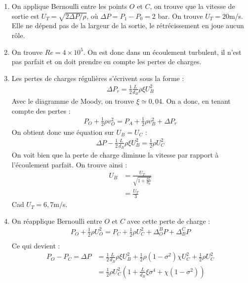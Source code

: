 \newpage

\begin{correction}

\begin{enumerate}

\item On applique Bernoulli entre les points $O$ et $C$, on trouve que la vitesse de sortie est $U_T=\sqrt{2\Delta P/\rho}$, où $\Delta P=P_1-P_0=2$ bar. On trouve $U_T=20$m/s. Elle ne dépend pas de la largeur de la sortie, le rétrécissement en joue aucun rôle.

\item On trouve $Re=4\times10^5$. On est donc dans un écoulement turbulent, il n'est pas parfait et on doit prendre en compte les pertes de charges.

\item Les pertes de charges régulières s'écrivent sous la forme :
\begin{align*}
	\Delta P_r = \frac{1}{2}\frac{L}{d_B}\rho\xi U_B^2
\end{align*}
Avec le diagramme de Moody, on trouve $\xi\simeq 0,04$.
On a donc, en tenant compte des pertes : 
\begin{align*}
	P_O+\frac{1}{2}\rho v_O^2=P_A+\frac{1}{2}\rho v_B^2 + \Delta P_r 
\end{align*}
On obtient donc une équation sur $U_B=U_C$ :
\begin{align*}
	\Delta P -\frac{1}{2}\frac{L}{d_B}\rho\xi U_B^2=\frac{1}{2}\rho U_C^2
\end{align*}
On voit bien que la perte de charge diminue la vitesse par rapport à l'écoulement parfait. On trouve ainsi :
\begin{align*}
	U_B&=\frac{U_T}{\sqrt{1+\frac{\xi L}{d_B}}} \\
	&=\frac{U_T}{3}
\end{align*}
Cad $U_T=6,7$m/s.

\item On réapplique Bernoulli entre $O$ et $C$ avec cette perte de charge :
\begin{align*}
P_O+\frac{1}{2}\rho U_O^2=P_C +\frac{1}{2}\rho U_C^2 + \Delta_O^B  P+\Delta_B^C P \\
\end{align*}
Ce qui devient :
\begin{align*}
	P_O-P_C = \Delta P &=\frac{1}{2}\frac{L}{d_B}\rho\xi U_B^2+\frac{1}{2}\rho\left(1-\sigma^2\right) \chi U_C^2 +\frac{1}{2}\rho U_C^2\\
	&=\frac{1}{2}\rho U_C^2\left(1+\frac{L}{d_B}\xi\sigma^4 +\chi\left(1-\sigma^2\right) \right) 
\end{align*}


\end{enumerate}
\end{correction}
